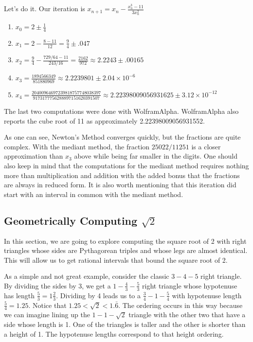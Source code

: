 \documentclass[12pt]{article}
\theoremstyle{remark}
\begin{document}
Let's do it. Our iteration is $x_{n+1} = x_n - \frac{x_n^3 -11}{3 x_n^2}$ 
\begin{enumerate}
\item $x_0 = 2 \pm \frac{1}{4}$
\item $x_1 = 2 - \frac{8- 11}{12} = \frac{9}{4} \pm .047$
\item $x_2 = \frac{9}{4} - \frac{ 729/64 - 11 }{243/16} = \frac{2162}{972}\approx 2.2243 \pm .00165$
\item $x_3 = \frac{1894566349}{851880969} \approx 2.2239801 \pm 2.04\times 10^{-6}$
\item $x_4 = \frac{20400964697239818757748038397}{9173177756288897151620391507} \approx 2.22398009056931625 \pm 3.12 \times 10^{-12}$
\end{enumerate}


The last two computations were done with WolframAlpha.  WolframAlpha also reports the cube root of 11 as approximately 2.22398009056931552. 

As one can see, Newton's Method converges quickly, but the fractions are quite complex. With the mediant method, the fraction $25022/11251$ is a closer approximation than $x_3$ above while being far smaller in the digits. One should also keep in mind that the computations for the mediant method requires nothing more than multiplication and addition with the added bonus that the fractions are always in reduced form. It is also worth mentioning that this iteration did start with an interval in common with the mediant method. 

\subsection{Geometrically Computing $\sqrt{2}$}

In this section, we are going to explore computing the square root of 2 with right triangles whose sides are Pythagorean triples and whose legs are almost identical. This will allow us to get rational intervals that bound the square root of 2. 

As a simple and not great example, consider the classic $3-4-5$ right triangle. By dividing the sides by 3, we get a $1-\frac{4}{3}-\frac{5}{3}$ right triangle whose hypotenuse has length $\frac{5}{3} = 1 \frac{2}{3}$. Dividing by 4 leads us to a $\frac{3}{4}-1-\frac{5}{4}$ with hypotenuse  length $\frac{5}{4} = 1.25$. Notice that $1.25 < \sqrt{2} < 1.\bar{6}$.  The ordering occurs in this way because we can imagine lining up the $1-1-\sqrt{2}$ triangle with the other two that have a side whose length is 1. One of the triangles is taller and the other is shorter than a height of 1. The hypotenuse lengths correspond to that height ordering. 
\end{document}
